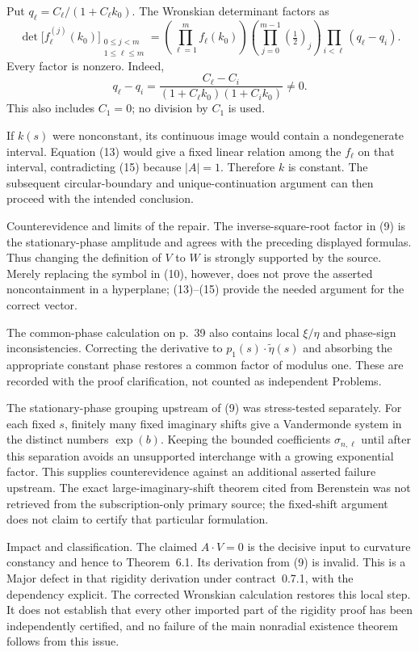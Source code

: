 \documentclass[10pt]{article}
\begin{document}
Put \(q_\ell=C_\ell/(1+C_\ell k_0)\). The Wronskian determinant factors as \[\det\bigl[f_\ell^{(j)}(k_0)\bigr]_
       {\substack{0\le j<m\\1\le\ell\le m}}
 =
 \left(\prod_{\ell=1}^m f_\ell(k_0)\right)
 \left(\prod_{j=0}^{m-1}\left(\tfrac12\right)_{\!j}\right)
 \prod_{i<\ell}(q_\ell-q_i).
 \tag{15}\] Every factor is nonzero. Indeed, \[q_\ell-q_i=
 \frac{C_\ell-C_i}{(1+C_\ell k_0)(1+C_i k_0)}\ne0.\] This also includes \(C_1=0\); no division by \(C_1\) is used.\par
If \(k(s)\) were nonconstant, its continuous image would contain a nondegenerate interval. Equation (13) would give a fixed linear relation among the \(f_\ell\) on that interval, contradicting (15) because \(|A|=1\). Therefore \(k\) is constant. The subsequent circular-boundary and unique-continuation argument can then proceed with the intended conclusion.\par
Counterevidence and limits of the repair. The inverse-square-root factor in (9) is the stationary-phase amplitude and agrees with the preceding displayed formulas. Thus changing the definition of \(V\) to \(W\) is strongly supported by the source. Merely replacing the symbol in (10), however, does not prove the asserted noncontainment in a hyperplane; (13)–(15) provide the needed argument for the correct vector.\par
The common-phase calculation on p. 39 also contains local \(\xi/\eta\) and phase-sign inconsistencies. Correcting the derivative to \(p_1(s)\cdot\widetilde\eta(s)\) and absorbing the appropriate constant phase restores a common factor of modulus one. These are recorded with the proof clarification, not counted as independent Problems.\par
The stationary-phase grouping upstream of (9) was stress-tested separately. For each fixed \(s\), finitely many fixed imaginary shifts give a Vandermonde system in the distinct numbers \(\exp(b)\). Keeping the bounded coefficients \(\sigma_{n,\ell}\) until after this separation avoids an unsupported interchange with a growing exponential factor. This supplies counterevidence against an additional asserted failure upstream. The exact large-imaginary-shift theorem cited from Berenstein was not retrieved from the subscription-only primary source; the fixed-shift argument does not claim to certify that particular formulation.\par
Impact and classification. The claimed \(A\cdot V=0\) is the decisive input to curvature constancy and hence to Theorem 6.1. Its derivation from (9) is invalid. This is a Major defect in that rigidity derivation under contract 0.7.1, with the dependency explicit. The corrected Wronskian calculation restores this local step. It does not establish that every other imported part of the rigidity proof has been independently certified, and no failure of the main nonradial existence theorem follows from this issue.\par
\end{document}
